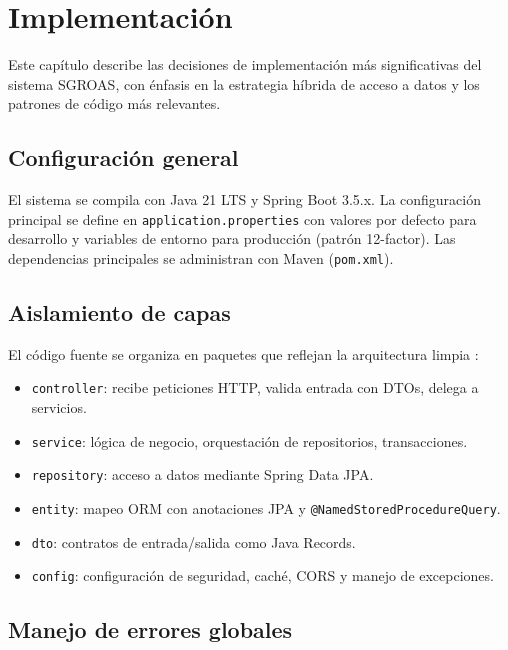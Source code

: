 \chapter{Implementación}
\label{cap:implementacion}

Este capítulo describe las decisiones de implementación más significativas del sistema SGROAS, con énfasis en la estrategia híbrida de acceso a datos y los patrones de código más relevantes.

\section{Configuración general}
\label{sec:configuracion}

El sistema se compila con Java 21 LTS y Spring Boot 3.5.x. La configuración principal se define en \texttt{application.properties} con valores por defecto para desarrollo y variables de entorno para producción (patrón 12-factor). Las dependencias principales se administran con Maven (\texttt{pom.xml}).

\section{Aislamiento de capas}
\label{sec:aislamiento}

El código fuente se organiza en paquetes que reflejan la arquitectura limpia \cite{martin2017}:

\begin{itemize}
  \item \texttt{controller}: recibe peticiones HTTP, valida entrada con DTOs, delega a servicios.
  \item \texttt{service}: lógica de negocio, orquestación de repositorios, transacciones.
  \item \texttt{repository}: acceso a datos mediante Spring Data JPA.
  \item \texttt{entity}: mapeo ORM con anotaciones JPA y \texttt{@NamedStoredProcedureQuery}.
  \item \texttt{dto}: contratos de entrada/salida como Java Records.
  \item \texttt{config}: configuración de seguridad, caché, CORS y manejo de excepciones.
\end{itemize}

\section{Manejo de errores globales}
\label{sec:errores}

